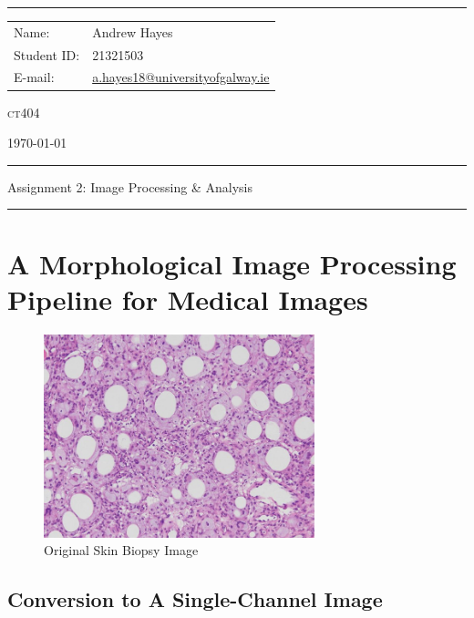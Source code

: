 \documentclass[a4paper]{article}
\newenvironment{code}{\captionsetup{type=listing}}{}
\begin{document}
\hrule \medskip
\begin{minipage}{0.295\textwidth} 
    \raggedright
    \footnotesize 
    \begin{tabular}{@{}l l}
        Name: & Andrew Hayes \\
        Student ID: & 21321503 \\
        E-mail: & \href{mailto://a.hayes18@universityofgalway.ie}{a.hayes18@universityofgalway.ie} \\
    \end{tabular}
\end{minipage}
\begin{minipage}{0.4\textwidth} 
    \centering 
    \vspace{0.4em}
    \LARGE
    \textsc{ct404} \\ 
\end{minipage}
\begin{minipage}{0.295\textwidth} 
    \raggedleft
    \today
\end{minipage}
\medskip\hrule 
\begin{center}
    \normalsize
    Assignment 2: Image Processing \& Analysis
\end{center}
\hrule

\section{A Morphological Image Processing Pipeline for Medical Images}
\begin{figure}[H]
    \centering
    \includegraphics[width=0.7\textwidth]{../Task1.jpg}
    \caption{Original Skin Biopsy Image}
\end{figure}

\subsection{Conversion to A Single-Channel Image}
\begin{code}
\inputminted[linenos, breaklines, frame=single]{python}{../code/task1/1_single_channel_conversion.py}
\caption{\texttt{1_single_channel_conversion.py}}
\end{code}
\end{document}

